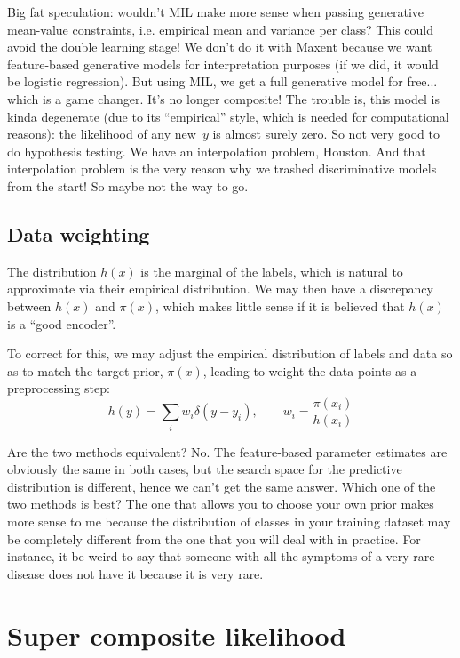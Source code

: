 \documentclass[english]{scrartcl}
\begin{document}
{\color{red} Big fat speculation: wouldn't MIL make more sense when passing generative mean-value constraints, i.e. empirical mean and variance per class? This could avoid the double learning stage! We don't do it with Maxent because we want feature-based generative models for interpretation purposes (if we did, it would be logistic regression). But using MIL, we get a full generative model for free... which is a game changer. It's no longer composite! The trouble is, this model is kinda degenerate (due to its ``empirical'' style, which is needed for computational reasons): the likelihood of any new~$y$ is almost surely zero. So not very good to do hypothesis testing. We have an interpolation problem, Houston. And that interpolation problem is the very reason why we trashed discriminative models from the start! So maybe not the way to go.}


\subsection{Data weighting}

The distribution $h(x)$ is the marginal of the labels, which is natural to approximate via their empirical distribution. We may then have a discrepancy between $h(x)$ and $\pi(x)$, which makes little sense if it is believed that $h(x)$ is a ``good encoder''. 

To correct for this, we may adjust the empirical distribution of labels and data so as to match the target prior, $\pi(x)$, leading to weight the data points as a preprocessing step:
$$
h(y) = \sum_i w_i \delta(y-y_i),
\qquad
w_i = \frac{\pi(x_i)}{h(x_i)}
$$

Are the two methods equivalent? No. The feature-based parameter estimates are obviously the same in both cases, but the search space for the predictive distribution is different, hence we can't get the same answer. Which one of the two methods is best? The one that allows you to choose your own prior makes more sense to me because the distribution of classes in your training dataset may be completely different from the one that you will deal with in practice. For instance, it be weird to say that someone with all the symptoms of a very rare disease does not have it because it is very rare. 



\section{Super composite likelihood}
\label{appendix:super}
\end{document}
